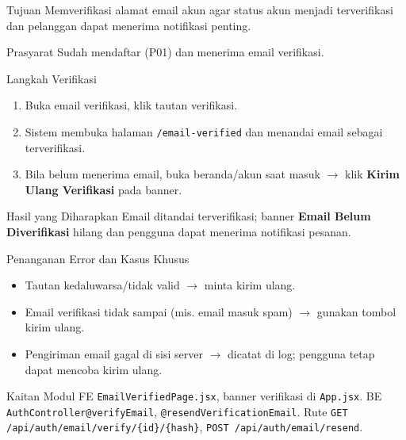 
\begin{flowsection}{Tujuan}
Memverifikasi alamat email akun agar status akun menjadi terverifikasi dan
pelanggan dapat menerima notifikasi penting.
\end{flowsection}

\begin{flowsection}{Prasyarat}
Sudah mendaftar (P01) dan menerima email verifikasi.
\end{flowsection}

\begin{flowsection}{Langkah Verifikasi}
\begin{enumerate}
  \item Buka email verifikasi, klik tautan verifikasi.
  \item Sistem membuka halaman \texttt{/email-verified} dan menandai email
        sebagai terverifikasi.
  \item Bila belum menerima email, buka beranda/akun saat masuk $\rightarrow$
        klik \textbf{Kirim Ulang Verifikasi} pada banner.
\end{enumerate}
\end{flowsection}


\begin{flowsection}{Hasil yang Diharapkan}
Email ditandai terverifikasi; banner \textbf{Email Belum Diverifikasi} hilang dan
pengguna dapat menerima notifikasi pesanan.
\end{flowsection}


\begin{flowsection}{Penanganan Error dan Kasus Khusus}
\begin{itemize}
  \item Tautan kedaluwarsa/tidak valid $\rightarrow$ minta kirim ulang.
  \item Email verifikasi tidak sampai (mis. email masuk spam) $\rightarrow$
        gunakan tombol kirim ulang.
  \item Pengiriman email gagal di sisi server $\rightarrow$ dicatat di log;
        pengguna tetap dapat mencoba kirim ulang.
\end{itemize}
\end{flowsection}

\begin{flowsection}{Kaitan Modul}
FE \texttt{EmailVerifiedPage.jsx}, banner verifikasi di \texttt{App.jsx}. BE
\texttt{AuthController@verifyEmail}, \texttt{@resendVerificationEmail}. Rute
\texttt{GET /api/auth/email/verify/\{id\}/\{hash\}}, \texttt{POST /api/auth/email/resend}.
\end{flowsection}

